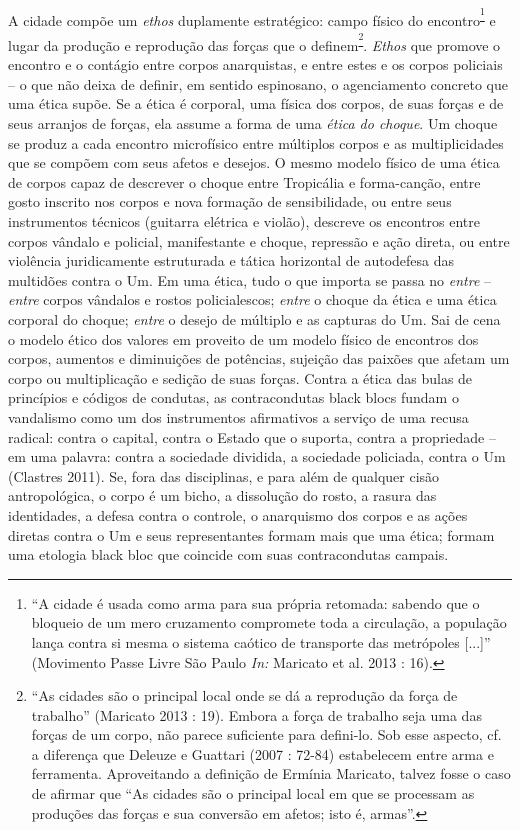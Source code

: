 A cidade compõe um \emph{ethos }duplamente estratégico: campo
físico do encontro\textsuperscript{\footnote{``A cidade é usada como
  arma para sua própria retomada: sabendo que o bloqueio de um mero
  cruzamento compromete toda a circulação, a população lança contra si
  mesma o sistema caótico de transporte das metrópoles {[}...{]}''
  (Movimento Passe Livre São Paulo \emph{In: }Maricato et al. 2013 :
  16).}} e lugar da produção e reprodução das forças que o
definem\textsuperscript{\footnote{``As cidades são o principal local
  onde se dá a reprodução da força de trabalho'' (Maricato 2013 : 19).
  Embora a força de trabalho seja uma das forças de um corpo, não parece
  suficiente para defini-lo. Sob esse aspecto, cf. a diferença que
  Deleuze e Guattari (2007 : 72-84) estabelecem entre arma e ferramenta.
  Aproveitando a definição de Ermínia Maricato, talvez fosse o caso de
  afirmar que ``As cidades são o principal local em que se processam as
  produções das forças e sua conversão em afetos; isto é, armas''.}}.
\emph{Ethos} que promove o encontro e o contágio entre corpos
anarquistas, e entre estes e os corpos policiais -- o que não deixa de
definir, em sentido espinosano, o agenciamento concreto que uma ética
supõe. Se a ética é corporal, uma física dos corpos, de suas forças e de
seus arranjos de forças, ela assume a forma de uma \emph{ética do
choque}. Um choque se produz a cada encontro microfísico entre múltiplos
corpos e as multiplicidades que se compõem com seus afetos e desejos. O
mesmo modelo físico de uma ética de corpos capaz de descrever o choque
entre Tropicália e forma-canção, entre gosto inscrito nos corpos e nova
formação de sensibilidade, ou entre seus instrumentos técnicos (guitarra
elétrica e violão), descreve os encontros entre corpos vândalo e
policial, manifestante e choque, repressão e ação direta, ou entre
violência juridicamente estruturada e tática horizontal de autodefesa
das multidões contra o Um. Em uma ética, tudo o que importa se passa no
\emph{entre} -- \emph{entre }corpos vândalos e rostos policialescos;
\emph{entre }o choque da ética e uma ética corporal do choque;
\emph{entre} o desejo de múltiplo e as capturas do Um. Sai de cena o
modelo ético dos valores em proveito de um modelo físico de encontros
dos corpos, aumentos e diminuições de potências, sujeição das paixões
que afetam um corpo ou multiplicação e sedição de suas forças. Contra a
ética das bulas de princípios e códigos de condutas, as contracondutas
black blocs fundam o vandalismo como um dos instrumentos afirmativos a
serviço de uma recusa radical: contra o capital, contra o Estado que o
suporta, contra a propriedade -- em uma palavra: contra a sociedade
dividida, a sociedade policiada, contra o Um (Clastres 2011). Se, fora
das disciplinas, e para além de qualquer cisão antropológica, o corpo é
um bicho, a dissolução do rosto, a rasura das identidades, a defesa
contra o controle, o anarquismo dos corpos e as ações diretas contra o
Um e seus representantes formam mais que uma ética; formam uma etologia
black bloc que coincide com suas contracondutas campais.

